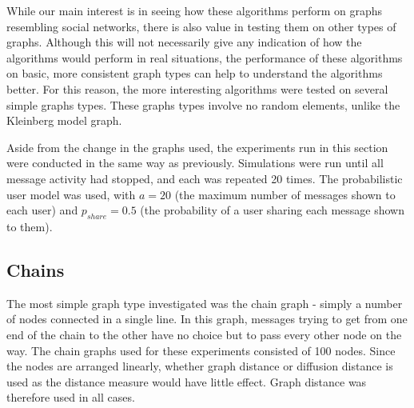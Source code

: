 \documentclass[bsc,frontabs,twoside,singlespacing,parskip,deptreport]{infthesis}     %
\begin{document}
While our main interest is in seeing how these algorithms perform on graphs resembling social networks, there is also value in testing them on other types of graphs. Although this will not necessarily give any indication of how the algorithms would perform in real situations, the performance of these algorithms on basic, more consistent graph types can help to understand the algorithms better. For this reason, the more interesting algorithms were tested on several simple graphs types. These graphs types involve no random elements, unlike the Kleinberg model graph.

Aside from the change in the graphs used, the experiments run in this section were conducted in the same way as previously. Simulations were run until all message activity had stopped, and each was repeated 20 times. The probabilistic user model was used, with $a=20$ (the maximum number of messages shown to each user) and $p_{share}=0.5$ (the probability of a user sharing each message shown to them).

\subsection{Chains}
The most simple graph type investigated was the chain graph - simply a number of nodes connected in a single line. In this graph, messages trying to get from one end of the chain to the other have no choice but to pass every other node on the way. The chain graphs used for these experiments consisted of 100 nodes. Since the nodes are arranged linearly, whether graph distance or diffusion distance is used as the distance measure would have little effect. Graph distance was therefore used in all cases.
\end{document}
